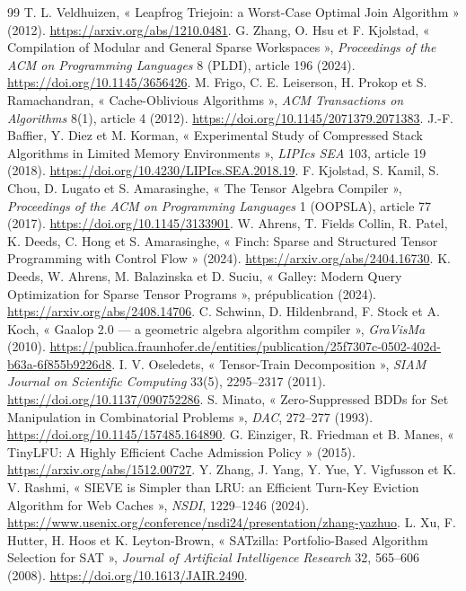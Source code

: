 \documentclass[11pt,a4paper]{article}
\begin{document}
\begin{thebibliography}{99}
 T. L. Veldhuizen, « Leapfrog Triejoin: a Worst-Case Optimal Join Algorithm » (2012). \url{https://arxiv.org/abs/1210.0481}.
 G. Zhang, O. Hsu et F. Kjolstad, « Compilation of Modular and General Sparse Workspaces », \emph{Proceedings of the ACM on Programming Languages} 8 (PLDI), article 196 (2024). \url{https://doi.org/10.1145/3656426}.
 M. Frigo, C. E. Leiserson, H. Prokop et S. Ramachandran, « Cache-Oblivious Algorithms », \emph{ACM Transactions on Algorithms} 8(1), article 4 (2012). \url{https://doi.org/10.1145/2071379.2071383}.
 J.-F. Baffier, Y. Diez et M. Korman, « Experimental Study of Compressed Stack Algorithms in Limited Memory Environments », \emph{LIPIcs SEA} 103, article 19 (2018). \url{https://doi.org/10.4230/LIPIcs.SEA.2018.19}.
 F. Kjolstad, S. Kamil, S. Chou, D. Lugato et S. Amarasinghe, « The Tensor Algebra Compiler », \emph{Proceedings of the ACM on Programming Languages} 1 (OOPSLA), article 77 (2017). \url{https://doi.org/10.1145/3133901}.
 W. Ahrens, T. Fields Collin, R. Patel, K. Deeds, C. Hong et S. Amarasinghe, « Finch: Sparse and Structured Tensor Programming with Control Flow » (2024). \url{https://arxiv.org/abs/2404.16730}.
 K. Deeds, W. Ahrens, M. Balazinska et D. Suciu, « Galley: Modern Query Optimization for Sparse Tensor Programs », prépublication (2024). \url{https://arxiv.org/abs/2408.14706}.
 C. Schwinn, D. Hildenbrand, F. Stock et A. Koch, « Gaalop 2.0 --- a geometric algebra algorithm compiler », \emph{GraVisMa} (2010). \url{https://publica.fraunhofer.de/entities/publication/25f7307c-0502-402d-b63a-6f855b9226d8}.
 I. V. Oseledets, « Tensor-Train Decomposition », \emph{SIAM Journal on Scientific Computing} 33(5), 2295--2317 (2011). \url{https://doi.org/10.1137/090752286}.
 S. Minato, « Zero-Suppressed BDDs for Set Manipulation in Combinatorial Problems », \emph{DAC}, 272--277 (1993). \url{https://doi.org/10.1145/157485.164890}.
 G. Einziger, R. Friedman et B. Manes, « TinyLFU: A Highly Efficient Cache Admission Policy » (2015). \url{https://arxiv.org/abs/1512.00727}.
 Y. Zhang, J. Yang, Y. Yue, Y. Vigfusson et K. V. Rashmi, « SIEVE is Simpler than LRU: an Efficient Turn-Key Eviction Algorithm for Web Caches », \emph{NSDI}, 1229--1246 (2024). \url{https://www.usenix.org/conference/nsdi24/presentation/zhang-yazhuo}.
 L. Xu, F. Hutter, H. Hoos et K. Leyton-Brown, « SATzilla: Portfolio-Based Algorithm Selection for SAT », \emph{Journal of Artificial Intelligence Research} 32, 565--606 (2008). \url{https://doi.org/10.1613/JAIR.2490}.

\end{thebibliography}
\end{document}
